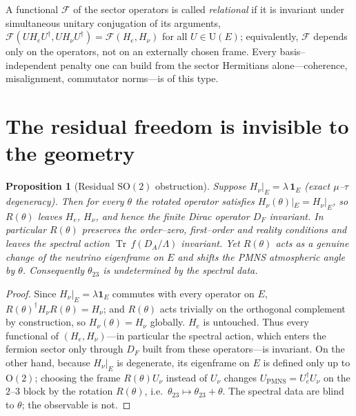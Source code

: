 \documentclass[11pt,a4paper]{article}
\newtheorem{proposition}[theorem]{Proposition}
\theoremstyle{definition}
\newcommand{\He}{H_e}
\newcommand{\Hnu}{H_\nu}
\newcommand{\PMNS}{U_{\mathrm{PMNS}}}
\newcommand{\Tr}{\operatorname{Tr}}
\newcommand{\one}{\mathbf 1}
\begin{document}
A functional $\mathcal F$ of the sector operators is called \emph{relational} if it
is invariant under simultaneous unitary conjugation of its arguments,
$\mathcal F(U\He U^\dagger, U\Hnu U^\dagger)=\mathcal F(\He,\Hnu)$ for all
$U\in\mathrm U(E)$; equivalently, $\mathcal F$ depends only on the operators, not on
an externally chosen frame. Every basis--independent penalty one can build from
the sector Hermitians alone---coherence, misalignment, commutator norms---is of
this type.

\section{The residual freedom is invisible to the geometry}\label{sec:obstruction}

\begin{proposition}[Residual $\mathrm{SO}(2)$ obstruction]\label{prop:obstruction}
Suppose $\Hnu|_E=\lambda\,\one_E$ (exact $\mu$--$\tau$ degeneracy). Then for every
$\theta$ the rotated operator satisfies $\Hnu(\theta)|_E=\Hnu|_E$, so $R(\theta)$
leaves $\He$, $\Hnu$, and hence the finite Dirac operator $D_F$ invariant. In
particular $R(\theta)$ preserves the order--zero, first--order and reality
conditions and leaves the spectral action $\Tr\,f(D_A/\Lambda)$ invariant. Yet
$R(\theta)$ acts as a genuine change of the neutrino eigenframe on $E$ and shifts
the PMNS atmospheric angle by $\theta$. Consequently $\theta_{23}$ is undetermined
by the spectral data.
\end{proposition}

\begin{proof}
Since $\Hnu|_E=\lambda\one_E$ commutes with every operator on $E$,
$R(\theta)^\dagger\Hnu R(\theta)=\Hnu$; and $R(\theta)$ acts trivially on the
orthogonal complement by construction, so $\Hnu(\theta)=\Hnu$ globally.
$\He$ is untouched. Thus every functional of $(\He,\Hnu)$---in particular the
spectral action, which enters the fermion sector only through $D_F$ built from
these operators---is invariant. On the other hand, because $\Hnu|_E$ is degenerate,
its eigenframe on $E$ is defined only up to $\mathrm{O}(2)$; choosing the frame
$R(\theta)U_\nu$ instead of $U_\nu$ changes $\PMNS=U_e^\dagger U_\nu$ on the
$2$--$3$ block by the rotation $R(\theta)$, i.e.\ $\theta_{23}\mapsto\theta_{23}+\theta$.
The spectral data are blind to $\theta$; the observable is not.
\end{proof}
\end{document}
